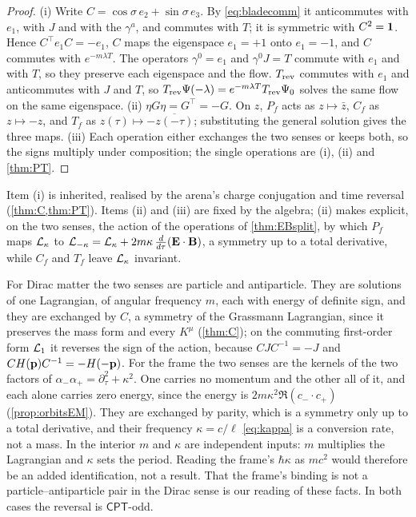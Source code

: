 \begin{proof}
(i) Write $C=\cos\sigma\,e_2+\sin\sigma\,e_3$. By \eqref{eq:bladecomm} it anticommutes with $e_1$, with $J$ and with the $\gamma^a$, and
commutes with $T$; it is symmetric with $C^2=\mathbf 1$. Hence $C^{\!\top}e_1C=-e_1$, $C$ maps the eigenspace $e_1=+1$ onto $e_1=-1$, and $C$ commutes
with $e^{-m\lambda T}$. The operators $\gamma^0=e_1$ and $\gamma^0J=T$ commute with $e_1$ and with $T$, so they preserve each eigenspace and the
flow. $T_{\rm rev}$ commutes with $e_1$ and anticommutes with $J$ and $T$, so $T_{\rm rev}\Psi(-\lambda)=e^{-m\lambda T}T_{\rm rev}\Psi_0$ solves the
same flow on the same eigenspace. (ii) $\eta G\eta=G^{\!\top}=-G$. On $z$, $P_f$ acts as $z\mapsto\bar z$, $C_f$ as $z\mapsto-z$, and $T_f$ as
$z(\tau)\mapsto-\overline{z(-\tau)}$; substituting the general solution gives the three maps. (iii) Each operation either exchanges the two
senses or keeps both, so the signs multiply under composition; the single operations are (i), (ii) and \cref{thm:PT}.
\end{proof}

Item (i) is inherited, realised by the arena's charge conjugation and time reversal (\cref{thm:C,thm:PT}). Items (ii) and (iii) are
fixed by the algebra; (ii) makes explicit, on the two senses, the action of the operations of \cref{thm:EBsplit}, by which $P_f$ maps
$\mathcal L_\kappa$ to $\mathcal L_{-\kappa}=\mathcal L_\kappa+2m\kappa\,\tfrac{d}{d\tau}(\mathbf E\cdot\mathbf B)$, a symmetry up to a total derivative, while $C_f$ and $T_f$ leave $\mathcal L_\kappa$ invariant.

For Dirac matter the two senses are particle and antiparticle. They are solutions of one Lagrangian, of angular frequency $m$, each with
energy of definite sign, and they are exchanged by $C$, a symmetry of the Grassmann Lagrangian, since it preserves the mass form and every
$K^\mu$ (\cref{thm:C}); on the commuting first-order form $\mathcal L_1$ it reverses the sign of the action, because $CJC^{-1}=-J$ and
$CH(\mathbf p)C^{-1}=-H(-\mathbf p)$. For the frame the two senses are the kernels of the two factors of $\alpha_-\alpha_+=\partial_\tau^2+\kappa^2$. One
carries no momentum and the other all of it, and each alone carries zero energy, since the energy is $2m\kappa^2\Re(c_-\cdot c_+)$
(\cref{prop:orbitsEM}). They are exchanged by parity, which is a symmetry only up to a total derivative, and their frequency
$\kappa=c/\ell$ \eqref{eq:kappa} is a conversion rate, not a mass. In the interior $m$ and $\kappa$ are independent inputs: $m$ multiplies the
Lagrangian and $\kappa$ sets the period. Reading the frame's $\hbar\kappa$ as $mc^2$ would therefore be an added identification, not a result.
That the frame's binding is not a particle--antiparticle pair in the Dirac sense is our reading of these facts. In both cases the
reversal is $\mathsf{CPT}$-odd.

